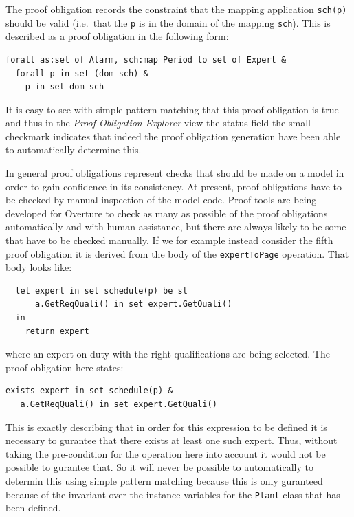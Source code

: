 The proof obligation records the constraint that the mapping application
\texttt{sch(p)} should be valid (i.e.\ that the \texttt{p} is in the
domain of the mapping \texttt{sch}). This is described as a proof
obligation in the following form:

\begin{lstlisting}
forall as:set of Alarm, sch:map Period to set of Expert &
  forall p in set (dom sch) &
    p in set dom sch
\end{lstlisting}
It is easy to see with simple pattern matching that this proof
obligation is true and thus in the \emph{Proof Obligation Explorer}
view the status field the small checkmark indicates that indeed the
proof obligation generation have been able to automatically determine
this. 

In general proof obligations represent checks that should be made on a
model in order to gain confidence in its consistency. At present,
proof obligations have to be checked by manual inspection of the model
code. Proof tools are being developed for Overture to check as many as
possible of the proof obligations automatically and with human
assistance, but there are always likely to be some that have to be
checked manually. If we for example instead consider the fifth proof
obligation it is derived from the body of the \texttt{expertToPage}
operation. That body looks like:

\begin{lstlisting}
  let expert in set schedule(p) be st
      a.GetReqQuali() in set expert.GetQuali()
  in
    return expert
\end{lstlisting}

\noindent where an expert on duty with the right qualifications are
being selected. The proof obligation here states:

\begin{lstlisting}
exists expert in set schedule(p) & 
   a.GetReqQuali() in set expert.GetQuali()
\end{lstlisting}

\noindent This is exactly describing that in order for this expression
to be defined it is necessary to gurantee that there exists at least
one such expert. Thus, without taking the pre-condition for the
operation here into account it would not be possible to gurantee
that. So it will never be possible to automatically to determin this
using simple pattern matching because this is only guranteed because
of the invariant over the instance variables for the \texttt{Plant}
class that has been defined.
 
